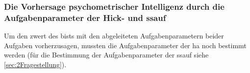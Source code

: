 \documentclass[11pt, twoside, a4paper]{book}		%
\begin{document}









\subsubsection*{Die Vorhersage psychometrischer Intelligenz durch die Aufgabenparameter der Hick- und \gls{ssauf}}

Um den \gls{zwert} des \gls{bist}s mit den abgeleiteten Aufgabenparametern beider Aufgaben vorherzusagen, mussten die Aufgabenparameter der \gls{ha} noch bestimmt werden (für die Bestimmung der Aufgabenparameter der \gls{ssauf} siehe \autoref{sec:2Fragestellung}). 
\end{document}
